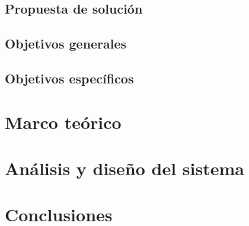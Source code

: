 \documentclass[12pt]{report}
\begin{document}
\section{Propuesta de solución}


\section{Objetivos generales}


\section{Objetivos específicos}



\chapter{Marco teórico}


\chapter{Análisis y diseño del sistema}


\chapter{Conclusiones}


\printbibliography

\printglossary

\clearpage

\printglossary[type=\acronymtype]
\end{document}

